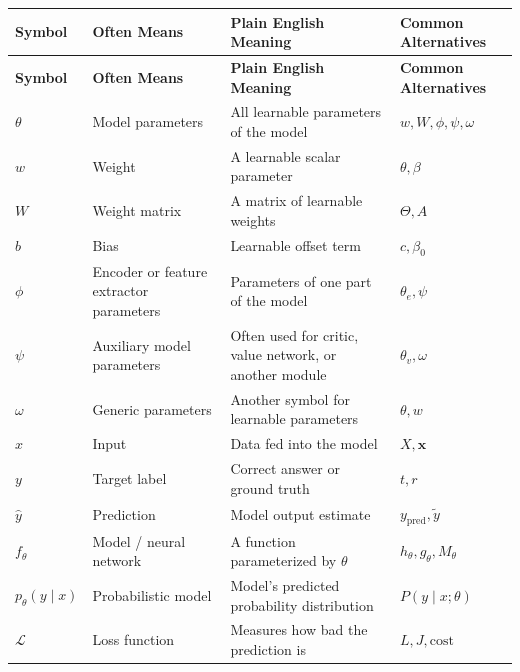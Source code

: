 \documentclass{article}
\begin{document}
\begin{longtable}{>{\centering\arraybackslash}p{2.2cm} p{3.5cm} p{5cm} p{3.5cm}}
\toprule
\textbf{Symbol} & \textbf{Often Means} & \textbf{Plain English Meaning} & \textbf{Common Alternatives} \\
\midrule
\endfirsthead

\toprule
\textbf{Symbol} & \textbf{Often Means} & \textbf{Plain English Meaning} & \textbf{Common Alternatives} \\
\midrule
\endhead

$\theta$ & Model parameters & All learnable parameters of the model & $w, W, \phi, \psi, \omega$ \\

$w$ & Weight & A learnable scalar parameter & $\theta, \beta$ \\

$W$ & Weight matrix & A matrix of learnable weights & $\Theta, A$ \\

$b$ & Bias & Learnable offset term & $c, \beta_0$ \\

$\phi$ & Encoder or feature extractor parameters & Parameters of one part of the model & $\theta_e, \psi$ \\

$\psi$ & Auxiliary model parameters & Often used for critic, value network, or another module & $\theta_v, \omega$ \\

$\omega$ & Generic parameters & Another symbol for learnable parameters & $\theta, w$ \\

$x$ & Input & Data fed into the model & $X, \mathbf{x}$ \\

$y$ & Target label & Correct answer or ground truth & $t, r$ \\

$\hat{y}$ & Prediction & Model output estimate & $y_{\text{pred}}, \tilde{y}$ \\

$f_\theta$ & Model / neural network & A function parameterized by $\theta$ & $h_\theta, g_\theta, M_\theta$ \\

$p_\theta(y \mid x)$ & Probabilistic model & Model's predicted probability distribution & $P(y \mid x;\theta)$ \\

$\mathcal{L}$ & Loss function & Measures how bad the prediction is & $L, J, \text{cost}$ \\


\end{longtable}
\end{document}
